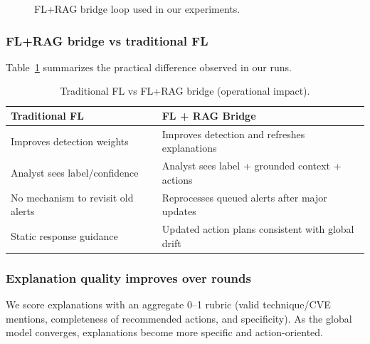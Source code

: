 \begin{figure}[t]
\centering
{}
\caption{FL+RAG bridge loop used in our experiments.}
\label{fig:rag_update_process}
\end{figure}

\subsubsection{FL+RAG bridge vs traditional FL}
Table~\ref{tab:flrag_vs_trad} summarizes the practical difference observed in our runs.

\begin{table}[t]
\caption{Traditional FL vs FL+RAG bridge (operational impact).}
\label{tab:flrag_vs_trad}
\centering
\begin{tabular}{p{}p{}}
\toprule
\textbf{Traditional FL} & \textbf{FL + RAG Bridge}\\
\midrule
Improves detection weights & Improves detection and refreshes explanations\\
Analyst sees label/confidence & Analyst sees label + grounded context + actions\\
No mechanism to revisit old alerts & Reprocesses queued alerts after major updates\\
Static response guidance & Updated action plans consistent with global drift\\
\bottomrule
\end{tabular}
\end{table}

\subsubsection{Explanation quality improves over rounds}
We score explanations with an aggregate 0--1 rubric (valid technique/CVE mentions, completeness of recommended actions, and specificity). As the global model converges, explanations become more specific and action-oriented.

